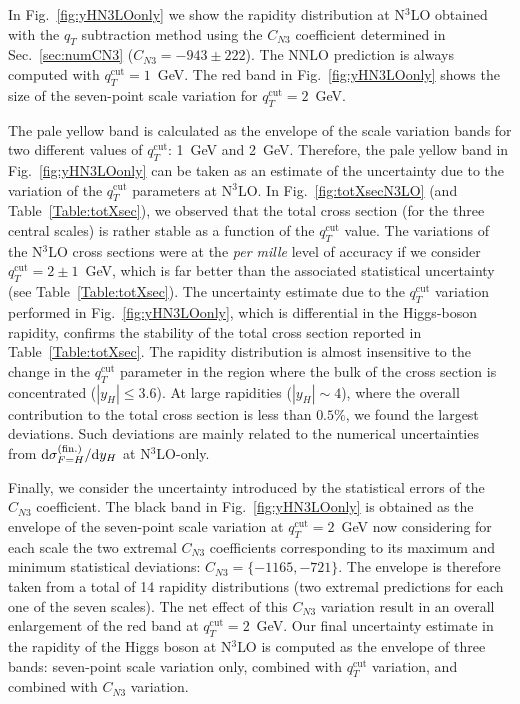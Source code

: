 \documentclass[12pt]{article}
\DeclareRobustCommand{\qt}{q_T}
\DeclareRobustCommand{\qtcut}{\ensuremath{q_T^\mathrm{cut}}}
\DeclareRobustCommand{\rd}{\ensuremath{\mathrm{d}}}
\begin{document}
In Fig.~\ref{fig:yHN3LOonly} we show the rapidity distribution at N$^{3}$LO obtained with the $\qt$ subtraction method using the $C_{N3}$ coefficient determined in Sec.~\ref{sec:numCN3} ($C_{N3}=-943 \pm 222$). The NNLO prediction is always computed with $\qtcut=1$~GeV. 
The red band in Fig.~\ref{fig:yHN3LOonly} shows the size of the seven-point scale variation for $\qtcut=2$~GeV. 

The pale yellow band is calculated as the envelope of the scale variation bands for two different values of $\qtcut$: 1~GeV and 2~GeV. Therefore, the pale yellow band in Fig.~\ref{fig:yHN3LOonly} can be taken as an estimate of the uncertainty due to the variation of the $\qtcut$ parameters at N$^{3}$LO. In Fig.~\ref{fig:totXsecN3LO} (and Table~\ref{Table:totXsec}), we observed that the total cross section (for the three central scales) is rather stable as a function of the $\qtcut$ value. The variations of the N$^{3}$LO cross sections were at the \textit{per mille} level of accuracy if we consider  $\qtcut=2 \pm 1$~GeV, which is far better than the associated statistical uncertainty (see Table~\ref{Table:totXsec}). The uncertainty estimate due to the $\qtcut$ variation performed in Fig.~\ref{fig:yHN3LOonly}, which is differential in the Higgs-boson rapidity, confirms the stability of the total cross section reported in Table~\ref{Table:totXsec}. 
The rapidity distribution is almost insensitive to the change in the $\qtcut$ parameter in the region where the bulk of the cross section is concentrated ($|y_{H}| \leq 3.6$). At large rapidities ($|y_{H}| \sim 4$), where the overall contribution to the total cross section is less than $0.5\%$, we found the largest deviations. Such deviations are mainly related to the numerical uncertainties from $\rd\sigma_{F=H}^{(\rm fin.)}/\rd y_H$ at  N$^3$LO-only.
 
Finally, we consider the uncertainty introduced by the statistical errors of the $C_{N3}$ coefficient. The black band in Fig.~\ref{fig:yHN3LOonly} is obtained as the envelope of the seven-point scale variation at $\qtcut=2$~GeV now considering for each scale the two extremal $C_{N3}$ coefficients corresponding to its maximum and minimum statistical deviations: $C_{N3} =\{-1165,-721\}$. The envelope is therefore taken from a total of 14 rapidity distributions (two extremal predictions for each one of the seven scales). The net effect of this $C_{N3}$ variation result in an overall enlargement of the red band at $\qtcut=2$~GeV. Our final uncertainty estimate in the rapidity of the Higgs boson at N$^{3}$LO is computed as the envelope of three bands: seven-point scale variation only, combined with $\qtcut$ variation, and combined with $C_{N3}$ variation. 
\end{document}
